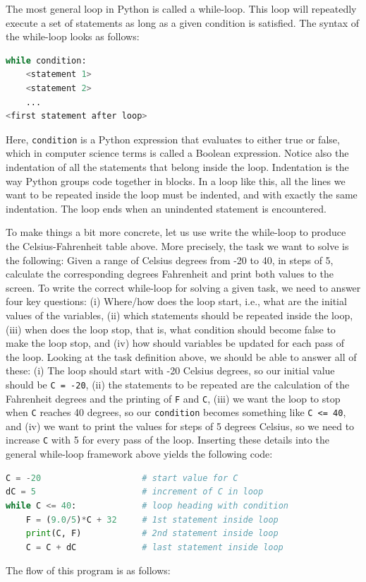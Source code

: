 \documentclass[graybox,envcountchap,sectrefs,final]{svmonodo}
\begin{document}
The most general loop in Python is called a while-loop. This loop will repeatedly execute a set of statements
as long as a given condition is satisfied. The syntax of the while-loop looks as follows:
\begin{lstlisting}[language=Python,style=blue1]
while condition:
    <statement 1>
    <statement 2>
    ...
<first statement after loop>
\end{lstlisting}
Here, \texttt{condition} is a Python expression that evaluates to either true or false, which in computer science terms is
called a Boolean expression. Notice also the indentation of all the statements that belong inside the loop.
Indentation is the way Python groups code together in blocks. In a loop like this, all the lines we want to
be repeated inside the loop must be indented, and with exactly the same indentation. The loop ends
when an unindented statement is encountered.

To make things a bit more concrete, let us use write the while-loop to produce the Celsius-Fahrenheit table above.
More precisely, the task we want to solve is the following:
Given a range of Celsius degrees from -20 to 40, in steps of 5,
calculate the corresponding degrees Fahrenheit and print both
values to the screen. To write the correct while-loop for solving a given task, we need to answer four key questions: (i) Where/how does
the loop start, i.e., what are the initial values of the variables, (ii) which statements should
be repeated inside the loop, (iii) when does the loop stop, that is, what
condition should become false to make the loop stop, and (iv) how should variables be updated for each pass
of the loop. Looking at the
task definition above, we should be able to answer all of these: (i) The loop should start with -20 Celsius degrees,
so our initial value should be \texttt{C = -20}, (ii) the statements to be repeated are the calculation of the
Fahrenheit degrees and the printing of \texttt{F} and \texttt{C}, (iii) we want the loop to stop when \texttt{C} reaches 40 degrees,
so our \texttt{condition} becomes something like \texttt{C <= 40}, and (iv) we want to print the values for steps of 5
degrees Celsius, so we need to increase \texttt{C} with 5 for every pass of the loop. Inserting these details into the
general while-loop framework above yields the following code:
\begin{lstlisting}[language=Python,style=blue1bar]
C = -20                    # start value for C
dC = 5                     # increment of C in loop
while C <= 40:             # loop heading with condition
    F = (9.0/5)*C + 32     # 1st statement inside loop
    print(C, F)            # 2nd statement inside loop
    C = C + dC             # last statement inside loop
\end{lstlisting}
The flow of this program is as follows:
\end{document}
